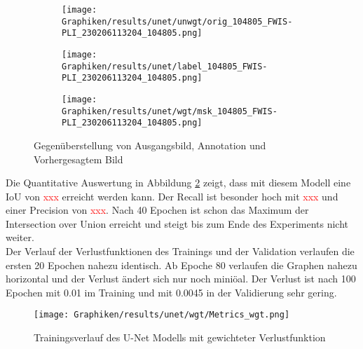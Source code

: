     
    \begin{figure}[h!]
        \begin{subfigure}[h]{0.3\linewidth}
            \texttt{[image: Graphiken/results/unet/unwgt/orig\_104805\_FWIS-PLI\_230206113204\_104805.png]}
            \caption{}
        \end{subfigure}
        \hfill
        \begin{subfigure}[h]{0.3\linewidth}
            \texttt{[image: Graphiken/results/unet/label\_104805\_FWIS-PLI\_230206113204\_104805.png]}
            \caption{}
        \end{subfigure}%
        \hfill
        \begin{subfigure}[h]{0.3\linewidth}
            \texttt{[image: Graphiken/results/unet/wgt/msk\_104805\_FWIS-PLI\_230206113204\_104805.png]}
            \caption{}
        \end{subfigure}%
        \caption{Gegenüberstellung von Ausgangsbild, Annotation und Vorhergesagtem Bild}
        \label{fig:unet_wgt_pred}
    \end{figure}
    Die Quantitative Auswertung in Abbildung \ref{fig:unet_wgt_metrics} zeigt, dass mit diesem Modell eine IoU von \textcolor{red}{xxx} erreicht werden kann. Der Recall ist besonder hoch mit \textcolor{red}{xxx} und einer Precision von \textcolor{red}{xxx}. Nach 40 Epochen ist schon das Maximum der Intersection over Union erreicht und steigt bis zum Ende des Experiments nicht weiter. \\
    Der Verlauf der Verlustfunktionen des Trainings und der Validation verlaufen die ersten 20 Epochen nahezu identisch. Ab Epoche 80 verlaufen die Graphen nahezu horizontal und der Verlust ändert sich nur noch miniöal. Der Verlust ist nach 100 Epochen mit 0.01 im Training und mit 0.0045 in der Validierung sehr gering. 
    
     \begin{figure}[h!]
         \centering
         \texttt{[image: Graphiken/results/unet/wgt/Metrics\_wgt.png]}
         \caption{Trainingsverlauf des U-Net Modells mit gewichteter Verlustfunktion}
         \label{fig:unet_wgt_metrics}
     \end{figure}


